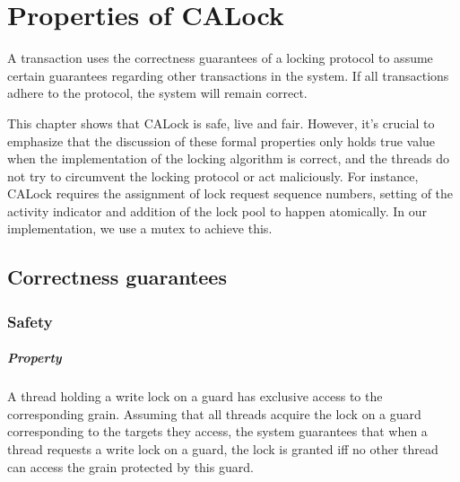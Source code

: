 \chapter{Properties of CALock} \label{chap:formalProperties}

\minitoc

A transaction uses the correctness guarantees of a locking protocol to assume certain guarantees regarding other transactions in the system. If all transactions adhere to the protocol, the system will remain correct.

This chapter shows that CALock is safe, live and fair. 
However, it's crucial to emphasize that the discussion of these formal properties only holds true value when the implementation of the locking algorithm is correct, and the threads do not try to circumvent the locking protocol or act maliciously. 
For instance, CALock requires the assignment of lock request sequence numbers, setting of the activity indicator and addition of the lock pool to happen atomically. In our implementation, we use a mutex to achieve this. 
%
\section{Correctness guarantees}

\subsection[Safety]{Safety}


\paragraph{Property} A thread holding a write lock on a guard has exclusive access to the corresponding grain. Assuming that all threads acquire the lock on a guard corresponding to the targets they access, the system guarantees that when a thread requests a write lock on a guard, the lock is granted iff no other thread can access the grain protected by this guard.

